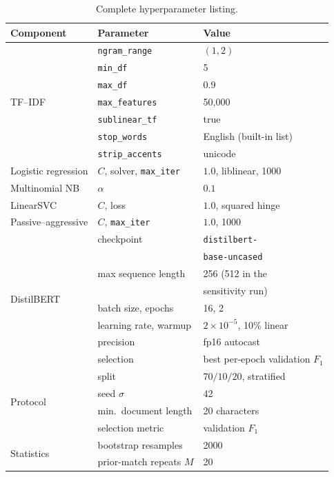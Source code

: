 \documentclass[conference]{IEEEtran}
\newcommand{\Fone}{$F_1$}
\begin{document}
\begin{table}[h]
\centering
\caption{Complete hyperparameter listing.}
\label{tab:hyper}
\footnotesize
\begin{tabular}{@{}llp{2.85cm}@{}}
\toprule
Component & Parameter & Value\\
\midrule
\multirow{7}{*}{TF--IDF}
 & \texttt{ngram\_range}  & $(1,2)$\\
 & \texttt{min\_df}       & 5\\
 & \texttt{max\_df}       & 0.9\\
 & \texttt{max\_features} & 50{,}000\\
 & \texttt{sublinear\_tf} & true\\
 & \texttt{stop\_words}   & English (built-in list)\\
 & \texttt{strip\_accents}& unicode\\
\midrule
Logistic regression & $C$, solver, \texttt{max\_iter} & $1.0$, liblinear, 1000\\
Multinomial NB      & $\alpha$ & $0.1$\\
LinearSVC           & $C$, loss & $1.0$, squared hinge\\
Passive--aggressive & $C$, \texttt{max\_iter} & $1.0$, 1000\\
\midrule
\multirow{8}{*}{DistilBERT}
 & checkpoint & \texttt{distilbert-}\\
 &            & \texttt{base-uncased}\\
 & max sequence length & 256 (512 in the\\
 &                     & sensitivity run)\\
 & batch size, epochs & 16, 2\\
 & learning rate, warmup & $2\times10^{-5}$, 10\% linear\\
 & precision & fp16 autocast\\
 & selection & best per-epoch validation \Fone{}\\
\midrule
\multirow{4}{*}{Protocol}
 & split & $70/10/20$, stratified\\
 & seed $\sigma$ & 42\\
 & min.\ document length & 20 characters\\
 & selection metric & validation \Fone{}\\
\midrule
\multirow{2}{*}{Statistics}
 & bootstrap resamples & 2000\\
 & prior-match repeats $M$ & 20\\
\bottomrule
\end{tabular}
\end{table}
\end{document}
